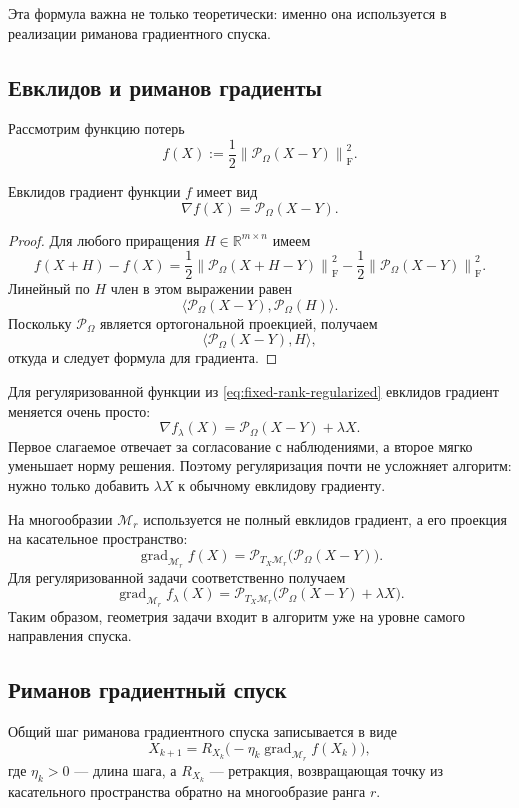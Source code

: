 \documentclass[a4paper,12pt]{article}
\newcommand{\R}{\mathbb{R}}
\newcommand{\fro}[1]{\left\lVert #1 \right\rVert_{\mathrm F}}
\newcommand{\grad}{\operatorname{grad}}
\renewcommand{\Proj}{\mathcal{P}}
\newcommand{\Mcal}{\mathcal{M}}
\begin{document}
Эта формула важна не только теоретически: именно она используется в реализации риманова градиентного спуска.

\subsection{Евклидов и риманов градиенты}

Рассмотрим функцию потерь
\[
f(X) := \frac12 \fro{\Proj_\Omega(X-Y)}^2.
\]

\begin{lemma}
Евклидов градиент функции $f$ имеет вид
\[
\nabla f(X) = \Proj_\Omega(X-Y).
\]
\end{lemma}

\begin{proof}
Для любого приращения $H \in \R^{m\times n}$ имеем
\[
f(X+H)-f(X)
= \frac12 \fro{\Proj_\Omega(X+H-Y)}^2
 - \frac12 \fro{\Proj_\Omega(X-Y)}^2.
\]
Линейный по $H$ член в этом выражении равен
\[
\langle \Proj_\Omega(X-Y), \Proj_\Omega(H)\rangle.
\]
Поскольку $\Proj_\Omega$ является ортогональной проекцией, получаем
\[
\langle \Proj_\Omega(X-Y), H\rangle,
\]
откуда и следует формула для градиента.
\end{proof}

Для регуляризованной функции из \eqref{eq:fixed-rank-regularized} евклидов градиент меняется очень просто:
\[
\nabla f_\lambda(X)=\Proj_\Omega(X-Y)+\lambda X.
\]
Первое слагаемое отвечает за согласование с наблюдениями, а второе мягко уменьшает норму решения. Поэтому регуляризация почти не усложняет алгоритм: нужно только добавить $\lambda X$ к обычному евклидову градиенту.

На многообразии $\Mcal_r$ используется не полный евклидов градиент, а его проекция на касательное пространство:
\[
\grad_{\Mcal_r} f(X) = \Proj_{T_X\Mcal_r}\bigl(\Proj_\Omega(X-Y)\bigr).
\]
Для регуляризованной задачи соответственно получаем
\[
\grad_{\Mcal_r} f_\lambda(X)
= \Proj_{T_X\Mcal_r}\bigl(\Proj_\Omega(X-Y)+\lambda X\bigr).
\]
Таким образом, геометрия задачи входит в алгоритм уже на уровне самого направления спуска.

\subsection{Риманов градиентный спуск}

Общий шаг риманова градиентного спуска записывается в виде
\begin{equation}
\label{eq:rgd}
X_{k+1} = R_{X_k}\bigl(-\eta_k \grad_{\Mcal_r} f(X_k)\bigr),
\end{equation}
где $\eta_k > 0$ --- длина шага, а $R_{X_k}$ --- ретракция, возвращающая точку из касательного пространства обратно на многообразие ранга $r$.
\end{document}
